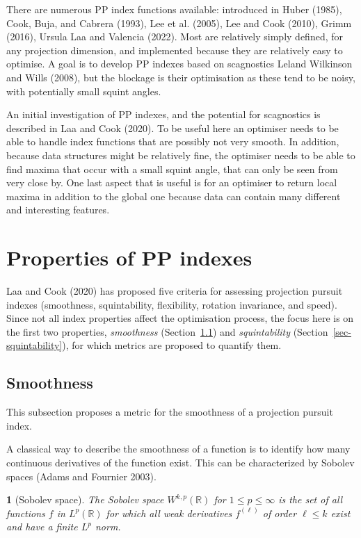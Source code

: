 \documentclass[
  12pt,
]{interact}
\theoremstyle{plain}
\newtheorem{defn}{\protect\definitionname}
\providecommand{\definitionname}{Definition}
\begin{document}
There are numerous PP index functions available: introduced in Huber
(1985), Cook, Buja, and Cabrera (1993), Lee et al. (2005), Lee and Cook
(2010), Grimm (2016), Ursula Laa and Valencia (2022). Most are
relatively simply defined, for any projection dimension, and implemented
because they are relatively easy to optimise. A goal is to develop PP
indexes based on scagnostics Leland Wilkinson and Wills (2008), but the
blockage is their optimisation as these tend to be noisy, with
potentially small squint angles.

An initial investigation of PP indexes, and the potential for
scagnostics is described in Laa and Cook (2020). To be useful here an
optimiser needs to be able to handle index functions that are possibly
not very smooth. In addition, because data structures might be
relatively fine, the optimiser needs to be able to find maxima that
occur with a small squint angle, that can only be seen from very close
by. One last aspect that is useful is for an optimiser to return local
maxima in addition to the global one because data can contain many
different and interesting features.

\section{Properties of PP indexes}\label{sec-PP-properties}

Laa and Cook (2020) has proposed five criteria for assessing projection
pursuit indexes (smoothness, squintability, flexibility, rotation
invariance, and speed). Since not all index properties affect the
optimisation process, the focus here is on the first two properties,
\emph{smoothness} (Section~\ref{sec-smoothness}) and
\emph{squintability} (Section~\ref{sec-squintability}), for which
metrics are proposed to quantify them.

\subsection{Smoothness}\label{sec-smoothness}

This subsection proposes a metric for the smoothness of a projection
pursuit index.

A classical way to describe the smoothness of a function is to identify
how many continuous derivatives of the function exist. This can be
characterized by Sobolev spaces (Adams and Fournier 2003).

\begin{defn}[Sobolev space]\label{def:sobolev_space}
The Sobolev space $W^{k,p}(\mathbb{R})$ for $1\leq p\leq \infty$ is the set of all functions $f$ in $L^p(\mathbb{R})$ for which all weak derivatives $f^{(\ell)}$ of order $\ell\leq k$ exist and have a finite $L^p$ norm.
\end{defn}
\end{document}
